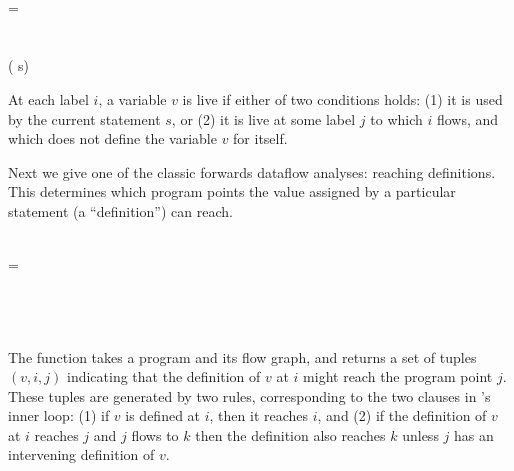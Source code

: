\begin{code}
   \isa \iso {} \to \iso {} \to
  \\
   \< \< = \\
  \quad {}\\
  \quad {}\\
  \quad \phantom{{}\cup}
  ( \x {}\<\dvar s)\\
  \quad
  \cup {}
\end{code}

\noindent
At each label $i$, a variable $v$ is live if either of two conditions holds: (1)
it is used by the current statement $s$, or (2) it is live at some label $j$ to
which $i$ flows, and which does not define the variable $v$ for itself.

Next we give one of the classic forwards dataflow analyses: reaching
definitions. This determines which program points the value assigned by a
particular statement (a ``definition'') can reach.

\nopagebreak[2]
\begin{code}
   \isa \iso{} \to \iso{} \to
  \\
   \< \< =\\
  \quad {}\\
  \quad {}\\
  \quad \phantom{{} \cup}
  \\
  \quad  \cup {}
\end{code}

\noindent
The function  takes a program and its flow graph, and returns a
set of tuples $(v, i, j)$ indicating that the definition of $v$ at $i$ might
reach the program point $j$. These tuples are generated by two rules,
corresponding to the two clauses in 's inner loop: (1) if $v$ is
defined at $i$, then it reaches $i$, and (2) if the definition of $v$ at $i$
reaches $j$ and $j$ flows to $k$ then the definition also reaches $k$ unless $j$
has an intervening definition of $v$.
